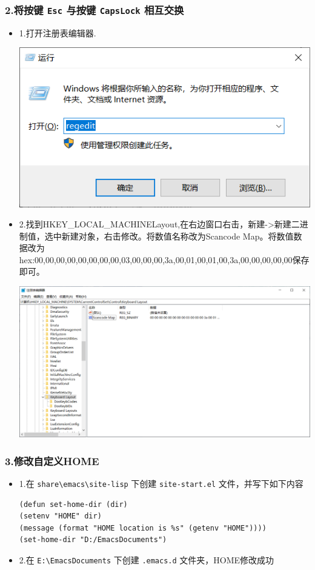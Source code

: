 \documentclass[UTF8]{ctexart}
\begin{document}
\subsubsection*{2.将按键 \texttt{Esc} 与按键 \texttt{CapsLock} 相互交换}
\label{sec:org1912120}
\begin{itemize}
\item 1.打开注册表编辑器.
\label{sec:org08c1376}
\begin{center}
\includegraphics[width=.9\linewidth]{image/1.png}
\end{center}
\item 2.找到HKEY\_LOCAL\_MACHINE\SYSTEM\CurrentControlSet\Control\Keyboard Layout,在右边窗口右击，新建->新建二进制值，选中新建对象，右击修改。将数值名称改为Scancode Map。将数值数据改为hex:00,00,00,00,00,00,00,00,03,00,00,00,3a,00,01,00,01,00,3a,00,00,00,00,00保存即可。
\label{sec:org39afecb}
\begin{center}
\includegraphics[width=.9\linewidth]{image/2.png}
\end{center}
\end{itemize}
\subsubsection*{3.修改自定义HOME}
\label{sec:org4e3c6bd}
\begin{itemize}
\item 1.在 \texttt{share\textbackslash{}emacs\textbackslash{}site-lisp} 下创建 \texttt{site-start.el} 文件，并写下如下内容
\label{sec:org0ab9eb5}
\begin{verbatim}
(defun set-home-dir (dir)
(setenv "HOME" dir)
(message (format "HOME location is %s" (getenv "HOME")))) 
(set-home-dir "D:/EmacsDocuments")
\end{verbatim}
\item 2.在 \texttt{E:\textbackslash{}EmacsDocuments} 下创建 \texttt{.emacs.d} 文件夹，HOME修改成功
\label{sec:org29cc1e4}
\end{itemize}
\end{document}
